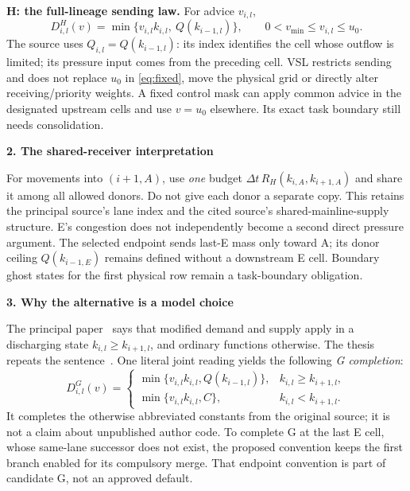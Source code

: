 \documentclass[10pt,a4paper]{article}
\newcommand{\head}[1]{\par\medskip\textbf{#1}\par}
\begin{document}
\textbf{H: the full-lineage sending law.} For advice $v_{i,l}$,
\begin{equation}
 D^H_{i,l}(v)=\min\{v_{i,l}k_{i,l},\ Q(k_{i-1,l})\},\qquad
 0<v_{\min}\leq v_{i,l}\leq u_0. \label{eq:demandH}
\end{equation}
The source uses $Q_{i,l}=Q(k_{i-1,l})$: its index identifies the cell whose
outflow is limited; its pressure input comes from the preceding cell. VSL
restricts sending and does not replace $u_0$ in \eqref{eq:fixed}, move the
physical grid or directly alter receiving/priority weights. A fixed control
mask can apply common advice in the designated upstream cells and use
$v=u_0$ elsewhere. Its exact task boundary still needs consolidation.

\head{2. The shared-receiver interpretation}
For movements into $(i+1,A)$, use \emph{one} budget
$\Delta t\,R_H(k_{i,A},k_{i+1,A})$ and share it among all allowed donors.
Do not give each donor a separate copy. This retains the principal source's
lane index and the cited source's shared-mainline-supply structure. E's
congestion does not independently become a second direct pressure argument.
The selected endpoint sends last-E mass only toward A; its donor ceiling
$Q(k_{i-1,E})$ remains defined without a downstream E cell. Boundary ghost
states for the first physical row remain a task-boundary obligation.

\newpage
\head{3. Why the alternative is a model choice}
The principal paper~\cite[eqs. (18)--(19) and following paragraph]{ns}
says that modified demand and supply apply in a discharging state
$k_{i,l}\geq k_{i+1,l}$, and ordinary functions otherwise. The thesis repeats
the sentence~\cite[chap. 3, eqs. (3.18)--(3.19)]{thesis}. One literal joint
reading yields the following \emph{G completion}:
\begin{equation}
 D^G_{i,l}(v)=
 \begin{cases}
 \min\{v_{i,l}k_{i,l},Q(k_{i-1,l})\},&k_{i,l}\geq k_{i+1,l},\\
 \min\{v_{i,l}k_{i,l},C\},&k_{i,l}<k_{i+1,l}.
 \end{cases} \label{eq:demandG}
\end{equation}
It completes the otherwise abbreviated constants from the original source;
it is not a claim about unpublished author code. To complete G at the last
E cell, whose same-lane successor does not exist, the proposed convention
keeps the first branch enabled for its compulsory merge. That endpoint
convention is part of candidate G, not an approved default.
\end{document}
